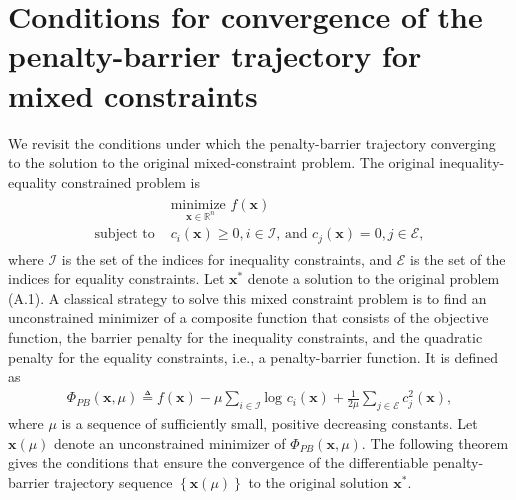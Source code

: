 \documentclass[12pt]{article}
\newcommand{\bs}{ \boldsymbol}
\newcommand{\mb}{\mathbb}
\newcommand{\lt}{\left}
\newcommand{\rt}{\right}
\begin{document}
{}


\appendix

\section{Conditions for convergence of the penalty-barrier trajectory for mixed constraints}
We revisit the conditions under which the  penalty-barrier trajectory converging to the solution to the original mixed-constraint problem. The original inequality-equality constrained problem is 
\begin{align}
\begin{split}
&\underset{\bs{x} \in \mb{R}^n}{\text{minimize }}f\lt(\bs{x}\rt)\\
\text{subject to }&  c_i\lt(\bs{x}\rt) \ge 0, i\in \mathcal{I} \text{, and } c_j\lt(\bs{x}\rt) = 0, j \in \mathcal{E} ,
\end{split}
\end{align}
where $\mathcal{I}$ is the set of the indices for inequality constraints, and $\mathcal{E}$ is the set of the indices for equality constraints. Let $\bs{x}^*$ denote a solution to the original problem (A.1). A classical strategy to solve this mixed constraint problem is to find an unconstrained minimizer of a composite function that consists of the objective function, the barrier penalty for the inequality constraints, and the quadratic penalty for the equality constraints, i.e., a penalty-barrier function. It is defined as
\begin{align}
\Phi_{PB}\lt(\bs{x}, \mu \rt) \triangleq f\lt(\bs{x}\rt) - \mu \underset{ i \in \mathcal{I}}{\sum} \text{log }c_i\lt(\bs{x}\rt) + \frac{1}{2\mu} \underset{j \in \mathcal{E}}{\sum}c^2_j\lt(\bs{x}\rt),
\end{align}
where $\mu$ is a sequence of sufficiently small, positive decreasing constants. Let $\bs{x}(\mu)$ denote an unconstrained minimizer of $\Phi_{PB}(\bs{x}, \mu)$. The following theorem gives the conditions that ensure the convergence of the differentiable penalty-barrier trajectory sequence $\lt\{ \bs{x}(\mu)\rt\}$ to the original solution $\bs{x}^*$.
\end{document}
